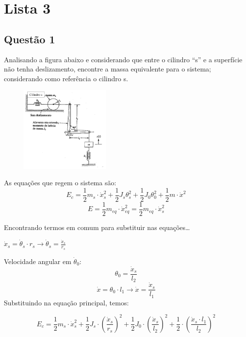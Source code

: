 \section{Lista 3}
\subsection{Questão 1}
Analisando a figura abaixo e considerando que entre o cilindro “s” e a superfície não tenha
deslizamento, encontre a massa equivalente para o sistema; considerando como referência o cilindro s.

\begin{figure}[ht]
    \centering
    \includegraphics[width=0.4\textwidth]{imagens/lista_3_questao_1.png}
    \label{fig:questao1}
\end{figure}

\resol
As equações que regem o sistema são:
\[
    E_c = \frac{1}{2}m_{s}\cdot {\dot{x}_{s}^2} + \frac{1}{2}J_{s}\theta_{s}^2 + \frac{1}{2}J_0\theta_{0}^2 + \frac{1}{2}m\cdot \dot{x}^2
\]
\[
    E = \frac{1}{2}m_{eq}\cdot \dot{x}_{eq}^2 = \frac{1}{2}m_{eq}\cdot \dot{x}_s^2
\]

Encontrando termos em comum para substituir nas equações\ldots

$\dot{x}_s = \dot{\theta}_s \cdot r_s \to \dot{\theta}_s = \frac{\dot{x}_s}{r_s}$

Velocidade angular em $\dot{\theta}_0$:
\[
    \theta_0 = \frac{\dot{x}_s}{l_2}
\]
\[
    \dot x = \theta_0 \cdot l_1 \to \dot x = \frac{\dot{x}_s}{l_1}
\]
Substituindo na equação principal, temos:

\[
    E_c = \frac{1}{2}m_s\cdot \dot{x}_s^2 + \frac{1}{2}J_s\cdot \left( \frac{\dot{x}_s}{r_s} \right)^2 + \frac{1}{2}J_0\cdot \left( \frac{\dot {x}_s}{l_2} \right)^2 + \frac{1}{2}\cdot \left( \frac{\dot {x}_s\cdot l_1}{l_2} \right)^2
\]


